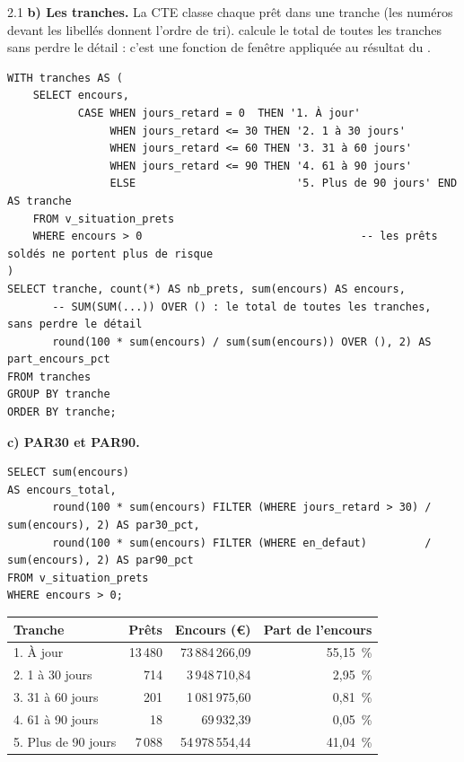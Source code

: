 \begin{correction}{2.1}
\textbf{b) Les tranches.} La CTE classe chaque prêt dans une tranche (les numéros devant les libellés
donnent l'ordre de tri).  calcule le total de toutes les tranches sans
perdre le détail : c'est une fonction de fenêtre appliquée au résultat du .

\begin{lstlisting}[style=long]
WITH tranches AS (
    SELECT encours,
           CASE WHEN jours_retard = 0  THEN '1. À jour'
                WHEN jours_retard <= 30 THEN '2. 1 à 30 jours'
                WHEN jours_retard <= 60 THEN '3. 31 à 60 jours'
                WHEN jours_retard <= 90 THEN '4. 61 à 90 jours'
                ELSE                         '5. Plus de 90 jours' END AS tranche
    FROM v_situation_prets
    WHERE encours > 0                                  -- les prêts soldés ne portent plus de risque
)
SELECT tranche, count(*) AS nb_prets, sum(encours) AS encours,
       -- SUM(SUM(...)) OVER () : le total de toutes les tranches, sans perdre le détail
       round(100 * sum(encours) / sum(sum(encours)) OVER (), 2) AS part_encours_pct
FROM tranches
GROUP BY tranche
ORDER BY tranche;
\end{lstlisting}

\textbf{c) PAR30 et PAR90.}
\begin{lstlisting}[style=long]
SELECT sum(encours)                                                               AS encours_total,
       round(100 * sum(encours) FILTER (WHERE jours_retard > 30) / sum(encours), 2) AS par30_pct,
       round(100 * sum(encours) FILTER (WHERE en_defaut)         / sum(encours), 2) AS par90_pct
FROM v_situation_prets
WHERE encours > 0;
\end{lstlisting}

\begin{resultat}
\begin{center}\small
\begin{tabular}{@{}lrrr@{}}
\toprule
Tranche & Prêts & Encours (€) & Part de l'encours \\
\midrule
1. À jour & 13\,480 & 73\,884\,266,09 & 55,15~\% \\
2. 1 à 30 jours & 714 & 3\,948\,710,84 & 2,95~\% \\
3. 31 à 60 jours & 201 & 1\,081\,975,60 & 0,81~\% \\
4. 61 à 90 jours & 18 & 69\,932,39 & 0,05~\% \\
5. Plus de 90 jours & 7\,088 & 54\,978\,554,44 & 41,04~\% \\
\bottomrule
\end{tabular}


\end{center}
\end{resultat}
\end{correction}
